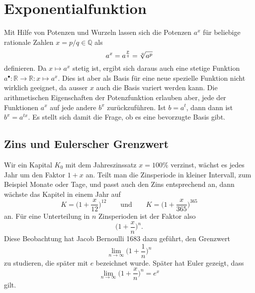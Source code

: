 %
%
%
\section{Exponentialfunktion 
\label{buch:exponential:section:grenzwert}}
Mit Hilfe von Potenzen und Wurzeln lassen sich die Potenzen $a^x$
für beliebige rationale Zahlen $x=p/q\in\mathbb{Q}$ als
\[
a^x = a^{\frac{p}{q}} = \root{q}\of{a^p}
\]
definieren.
Da $x\mapsto a^x$ stetig ist, ergibt sich daraus auch eine
stetige Funktion
$a^{\bullet}\colon \mathbb{R}\to\mathbb{R}:x\mapsto a^x$.
Dies ist aber als Basis für eine neue spezielle Funktion nicht
wirklich geeignet, da ausser $x$ auch die Basis variert werden kann.
Die arithmetischen Eigenschaften der Potenzfunktion erlauben aber,
jede der Funktionen $a^x$ auf jede andere $b^x$ zurückzuführen.
Ist $b=a^t$, dann dann ist $b^x = a^{tx}$.
Es stellt sich damit die Frage, ob es eine bevorzugte Basis gibt.

%
%
\subsection{Zins und Eulerscher Grenzwert}
Wir ein Kapital $K_0$ mit dem Jahreszinssatz $x=100\%$ verzinst,
wächst es jedes Jahr um den Faktor $1+x$ an.
Teilt man die Zinsperiode in kleiner Intervall, zum Beispiel Monate
oder Tage, und passt auch den Zins entsprechend an, dann wächste
das Kapitel in einem Jahr auf
\[
K = \biggl(1+\frac{x}{12}\biggr)^{12}
\qquad\text{und}\qquad
K = \biggl(1+\frac{x}{365}\biggr)^{365}
\]
an.
Für eine Unterteilung in $n$ Zinsperioden ist der Faktor also
\[
\biggl(1+\frac{x}{n}\biggr)^n.
\]
Diese Beobachtung hat Jacob Bernoulli 1683 dazu geführt, den Grenzwert
\[
\lim_{n\to\infty} \biggl(1+\frac1n\biggr)^n
\]
zu studieren, die später mit $e$ bezeichnet wurde.
Später hat Euler gezeigt, dass 
\begin{equation}
\lim_{n\to\infty}\biggl(1+\frac{x}{n}\biggr)^n
=
e^x
\label{buch:exponential:zins:eulerex}
\end{equation}
gilt.


